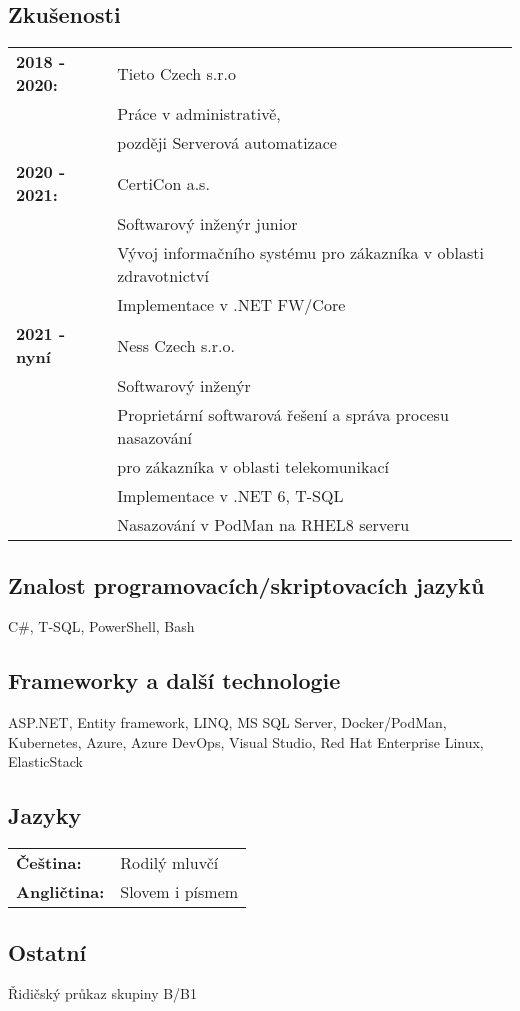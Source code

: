 \documentclass[a4paper]{article}
\begin{document}
\subsection*{Zkušenosti}
\begin{tabular}{>{\bfseries}l l}
    2018 - 2020: & Tieto Czech s.r.o \\
                 & Práce v administrativě, \\
                 & později Serverová automatizace \\
    2020 - 2021: & CertiCon a.s. \\
                 & Softwarový inženýr junior  \\
                 & Vývoj informačního systému pro zákazníka v oblasti zdravotnictví \\
                 & Implementace v .NET FW/Core \\
    2021 - nyní  & Ness Czech s.r.o. \\
                 & Softwarový inženýr \\
                 & Proprietární softwarová řešení a správa procesu nasazování \\
                 & pro zákazníka v oblasti telekomunikací \\
                 & Implementace v .NET 6, T-SQL \\
                 & Nasazování v PodMan na RHEL8 serveru \\ 
\end{tabular}

\subsection*{Znalost programovacích/skriptovacích jazyků}
C\#, T-SQL, PowerShell, Bash

\subsection*{Frameworky a další technologie}
ASP.NET, Entity framework, LINQ, MS SQL Server, Docker/PodMan, Kubernetes, Azure, Azure DevOps, Visual Studio, Red Hat Enterprise Linux, ElasticStack

\subsection*{Jazyky}
\begin{tabular}{>{\bfseries}l l}
    Čeština: & Rodilý mluvčí \\
    Angličtina: & Slovem i písmem
\end{tabular}

\subsection*{Ostatní}
Řidičský průkaz skupiny B/B1
\end{document}
